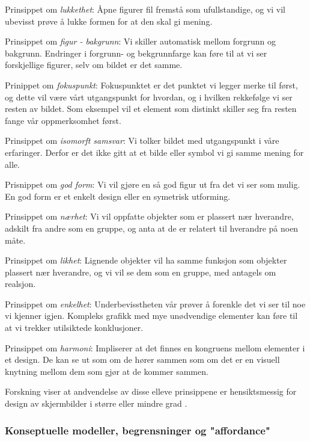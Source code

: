 \noindent
Prinsippet om \emph{lukkethet}: Åpne figurer fil fremstå som ufullstandige, og vi vil ubevisst prøve å lukke formen for at den skal gi mening.

\noindent
Prinsippet om \emph{figur - bakgrunn}: Vi skiller automatisk mellom forgrunn og bakgrunn. Endringer i forgrunn- og bekgrunnfarge kan føre til at vi ser forskjellige figurer, selv om bildet er det samme.

\noindent
Prinippet om \emph{fokuspunkt}: Fokuspunktet er det punktet vi legger merke til først, og dette vil være vårt utgangspunkt for hvordan, og i hvilken rekkefølge vi ser resten av bildet. Som eksempel vil et element som distinkt skiller seg fra resten fange vår oppmerksomhet først.

\noindent
Prinsippet om \emph{isomorft samsvar}: Vi tolker bildet med utgangspunkt i våre erfaringer. Derfor er det ikke gitt at et bilde eller symbol vi gi samme mening for alle.

\noindent
Prisnippet om \emph{god form}: Vi vil gjøre en så god figur ut fra det vi ser som mulig. En god form er et enkelt design eller en symetrisk utforming.

\noindent
Prinsippet om \emph{nærhet}: Vi vil oppfatte objekter som er plassert nær hverandre, adskilt fra andre som en gruppe, og anta at de er relatert til hverandre på noen måte.

\noindent
Prinsippet om \emph{likhet}: Lignende objekter vil ha samme funksjon som objekter plassert nær hverandre, og vi vil se dem som en gruppe, med antagels om realsjon.

\noindent
Prinsippet om \emph{enkelhet}: Underbevisstheten vår prøver å forenkle det vi ser til noe vi kjenner igjen. Kompleks grafikk med mye unødvendige elementer kan føre til at vi trekker utilsiktede konklusjoner.

\noindent
Prinsippet om \emph{harmoni}: Impliserer at det finnes en kongruens mellom elementer i et design. De kan se ut som om de hører sammen som om det er en visuell knytning mellom dem som gjør at de kommer sammen.

\noindent
Forskning viser at andvendelse av disse elleve prinsippene er hensiktsmessig for design av skjermbilder i større eller mindre grad \cite{Chang02}.

\noindent
\subsubsection{Konseptuelle modeller, begrensninger og "affordance"}

